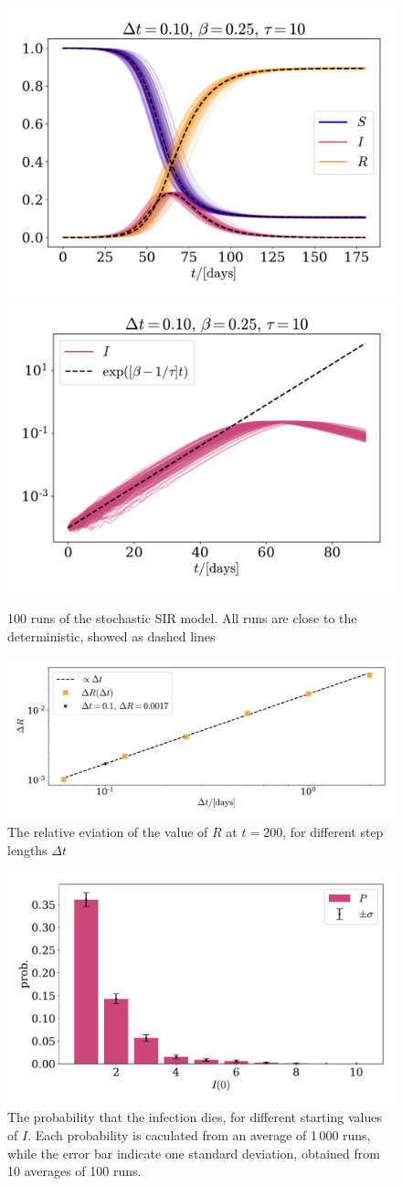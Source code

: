 \documentclass{article}
\begin{document}
    \begin{figure}[H]
        \centering
        \includegraphics[width=.49\textwidth]{../plots/2B/TestSIR_stoch.pdf}
        \includegraphics[width=.49\textwidth]{../plots/2B/TestI_stoch.pdf}
        \caption{100 runs of the stochastic SIR model. All runs are close to the deterministic, showed as dashed lines}
        \label{stochastic SIR}
    \end{figure}

    \begin{figure}[H]
        \centering
        \includegraphics[width=.7\textwidth]{../plots/2B/conv.pdf}
        \caption{The relative eviation of the value of $R$ at $t=200$, for different step lengths $\Delta t$}
        \label{conv}
    \end{figure}


    \begin{figure}[H]
        \centering
        \includegraphics[width=.7\textwidth]{../plots/2B/disappear.pdf}
        \caption{The probability that the infection dies, for different starting values of $I$. Each probability is caculated from an average of 1\,000 runs, while the error bar indicate one standard deviation, obtained from 10 averages of 100 runs.}
        \label{Disappear}
    \end{figure}
\end{document}

